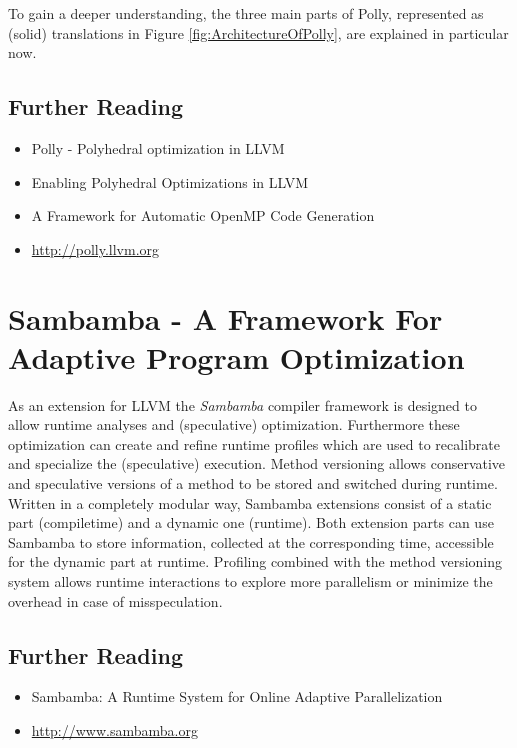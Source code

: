 To gain a deeper understanding,  the three main parts of Polly, 
represented as (solid) translations in Figure \ref{fig:ArchitectureOfPolly},
are explained in particular now.

\subsection*{Further Reading}

\begin{itemize}
  \item Polly - Polyhedral optimization in LLVM \cite{grosser.11.impact}  
  \item Enabling Polyhedral Optimizations in LLVM \cite{grosser:thesis}
  \item A Framework for Automatic OpenMP Code Generation \cite{raghesh2011framework}
  \item \url{http://polly.llvm.org} \nocite{Polly:Online}
\end{itemize}


\section{Sambamba - A Framework For Adaptive Program Optimization}
As an extension for LLVM the \textit{Sambamba} compiler framework is designed to
allow runtime analyses and (speculative) optimization.
Furthermore these optimization can create and refine runtime profiles which
are used to recalibrate and specialize the (speculative) execution. Method 
versioning allows conservative and speculative 
versions of a method to be stored and switched during runtime. 
Written in a completely modular way, Sambamba extensions consist 
of a static part (compiletime) and a dynamic one (runtime). 
Both extension parts can use Sambamba to store information,
collected at the corresponding time, accessible for the dynamic part at 
runtime.
Profiling combined with the method versioning system allows runtime interactions
to explore more parallelism or minimize the overhead in case of misspeculation. 


\subsection*{Further Reading}
\begin{itemize}
  \item Sambamba: A Runtime System for Online Adaptive Parallelization \cite{DBLP:conf/cc/StreitHZH12}  
  \item \url{http://www.sambamba.org} \nocite{StreitHZH12:Online}
\end{itemize}

